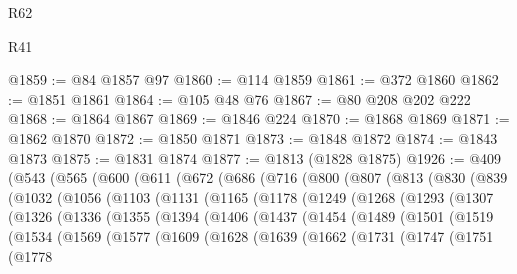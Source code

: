\begin{lexlean}{R62}
\begin{lexlean}{R41}
\begin{coremodule}
{{{{{{{{{{{{{{{{{{{{{{{{{{{{{{{{{{{{{{{{{{{{{{{{{{{{{{{{{{{{{{{{{{{{{{{{{{{{{{{{{{{{{{{@1859 := @84 @1857 @97
@1860 := @114 @1859
@1861 := @372 @1860
@1862 := @1851 @1861
@1864 := @105 @48 @76
@1867 := @80 @208 @202 @222
@1868 := @1864 @1867
@1869 := @1846 @224
@1870 := @1868 @1869
@1871 := @1862 @1870
@1872 := @1850 @1871
@1873 := @1848 @1872
@1874 := @1843 @1873
@1875 := @1831 @1874
@1877 := @1813 (@1828 @1875)
@1926 := @409
    (@543
      (@565
        (@600
          (@611
            (@672
              (@686
                (@716
                  (@800
                    (@807
                      (@813
                        (@830
                          (@839
                            (@1032
                              (@1056
                                (@1103
                                  (@1131
                                    (@1165
                                      (@1178
                                        (@1249
                                          (@1268
                                            (@1293
                                              (@1307
                                                (@1326
                                                  (@1336
                                                    (@1355
                                                      (@1394
                                                        (@1406
                                                          (@1437
                                                            (@1454
                                                              (@1489
                                                                (@1501
                                                                  (@1519
                                                                    (@1534
                                                                      (@1569
                                                                        (@1577
                                                                          (@1609
                                                                            (@1628
                                                                              (@1639
                                                                                (@1662
                                                                                  (@1731
                                                                                    (@1747
                                                                                      (@1751
                                                                                        (@1778
}}}}}}}}}}}}}}}}}}}}}}}}}}}}}}}}}}}}}}}}}}}}}}}}}}}}}}}}}}}}}}}}}}}}}}}}}}}}}}}}}}}}}}}
\end{coremodule}
\end{lexlean}
\end{lexlean}
